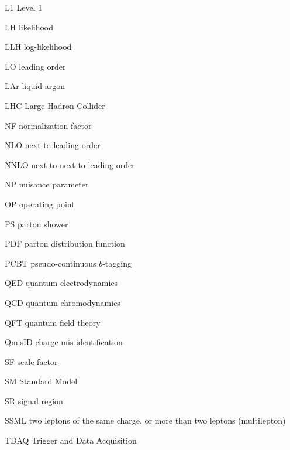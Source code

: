 \documentclass{msuphddissertation}
\begin{document}
\begin{abbrev}
\begin{abbreviations}
\item[L1] Level 1
\item[LH] likelihood
\item[LLH] log-likelihood
\item[LO] leading order
\item[LAr] liquid argon
\item[LHC] Large Hadron Collider
\item[NF] normalization factor
\item[NLO] next-to-leading order
\item[NNLO] next-to-next-to-leading order
\item[NP] nuisance parameter
\item[OP] operating point
\item[PS] parton shower
\item[PDF] parton distribution function
\item[PCBT] pseudo-continuous $b$-tagging
\item[QED] quantum electrodynamics
\item[QCD] quantum chromodynamics
\item[QFT] quantum field theory
\item[QmisID] charge mis-identification
\item[SF] scale factor
\item[SM] Standard Model
\item[SR] signal region
\item[SSML] two leptons of the same charge, or more than two leptons (multilepton)
\item[TDAQ] Trigger and Data Acquisition
\end{abbreviations}
\end{abbrev}
\end{document}
